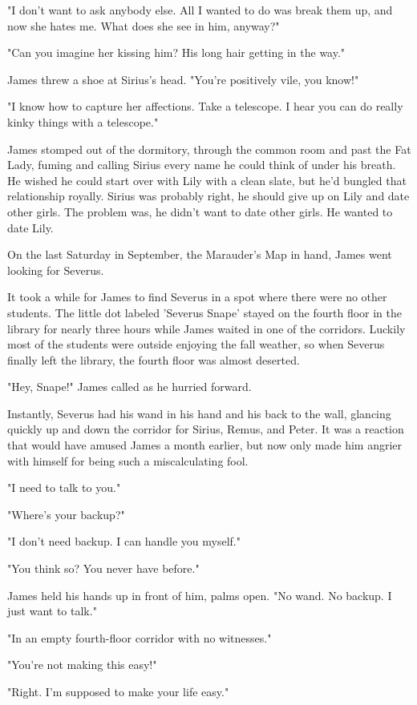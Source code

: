 \documentclass[a4paper,11pt]{article}
\begin{document}
"I don't want to ask anybody else. All I wanted to do was break them up, and now she hates me. What does she see in him, anyway?"

"Can you imagine her kissing him? His long hair getting in the way."

James threw a shoe at Sirius's head. "You're positively vile, you know!"

"I know how to capture her affections. Take a telescope. I hear you can do really kinky things with a telescope."

James stomped out of the dormitory, through the common room and past the Fat Lady, fuming and calling Sirius every name he could think of under his breath. He wished he could start over with Lily with a clean slate, but he'd bungled that relationship royally. Sirius was probably right, he should give up on Lily and date other girls. The problem was, he didn't want to date other girls. He wanted to date Lily.

On the last Saturday in September, the Marauder's Map in hand, James went looking for Severus.

It took a while for James to find Severus in a spot where there were no other students. The little dot labeled 'Severus Snape' stayed on the fourth floor in the library for nearly three hours while James waited in one of the corridors. Luckily most of the students were outside enjoying the fall weather, so when Severus finally left the library, the fourth floor was almost deserted.

"Hey, Snape!" James called as he hurried forward.

Instantly, Severus had his wand in his hand and his back to the wall, glancing quickly up and down the corridor for Sirius, Remus, and Peter. It was a reaction that would have amused James a month earlier, but now only made him angrier with himself for being such a miscalculating fool.

"I need to talk to you."

"Where's your backup?"

"I don't need backup. I can handle you myself."

"You think so? You never have before."

James held his hands up in front of him, palms open. "No wand. No backup. I just want to talk."

"In an empty fourth-floor corridor with no witnesses."

"You're not making this easy!"

"Right. I'm supposed to make your life easy."
\end{document}
